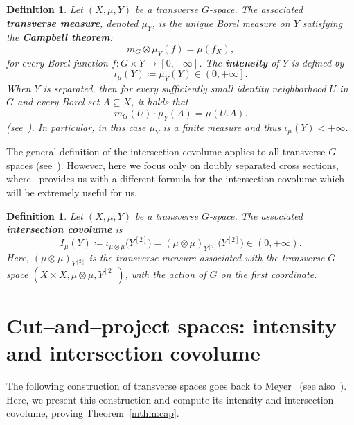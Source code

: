\documentclass{amsart}
\numberwithin{equation}{subsection}
\newtheorem{defn}[thm]{Definition}
\theoremstyle{remark}
\begin{document}
\begin{defn}
Let \(\left(X,\mu,Y\right)\) be a transverse \(G\)-space. The associated {\bf transverse measure}, denoted \(\mu_{Y}\), is the unique Borel measure on \(Y\) satisfying the {\bf Campbell theorem}:
\[m_{G}\otimes\mu_{Y}\left(f\right)=\mu\left(f_{X}\right),\]
for every Borel function \(f:G\times Y\to\left[0,+\infty\right]\). The {\bf intensity} of \(Y\) is defined by
\[\iota_{\mu}\left(Y\right)\coloneqq\mu_{Y}\left(Y\right)\in\left(0,+\infty\right].\]
When \(Y\) is separated, then for every sufficiently small identity neighborhood \(U\) in \(G\) and every Borel set \(A\subseteq X\), it holds that
\[m_{G}\left(U\right)\cdot\mu_{Y}\left(A\right)=\mu\left(U.A\right).\]
(see~\cite[Proposition 4.8]{AvBjCuI}). In particular, in this case \(\mu_{Y}\) is a finite measure and thus \(\iota_{\mu}\left(Y\right)<+\infty\).
\end{defn}

The general definition of the intersection covolume applies to all transverse \(G\)-spaces (see~\cite[\S7]{AvBjCuI}). However, here we focus only on doubly separated cross sections, where~\cite[Proposition 6.2]{AvBjCuI} provides us with a different formula for the intersection covolume which will be extremely useful for us.

\begin{defn}\label{dfn:intvol}
Let \(\left(X,\mu,Y\right)\) be a transverse \(G\)-space. The associated {\bf intersection covolume} is
\[I_{\mu}\left(Y\right)\coloneqq\iota_{\mu\otimes\mu}\big(Y^{\left[2\right]}\big)=\left(\mu\otimes\mu\right)_{Y^{\left[2\right]}}\big(Y^{\left[2\right]}\big)\in\left(0,+\infty\right).\]
Here, \(\left(\mu\otimes\mu\right)_{Y^{\left[2\right]}}\) is the transverse measure associated with the transverse \(G\)-space \(\left(X\times X,\mu\otimes\mu,Y^{\left[2\right]}\right)\), with the action of \(G\) on the first coordinate.
\end{defn}

\section{Cut--and--project spaces: intensity and intersection covolume}

The following construction of transverse spaces goes back to Meyer~\cite{meyer1972algebraic} (see also~\cite{BaakeGrimm2013}). Here, we present this construction and compute its intensity and intersection covolume, proving Theorem~\ref{mthm:cap}.
\end{document}
